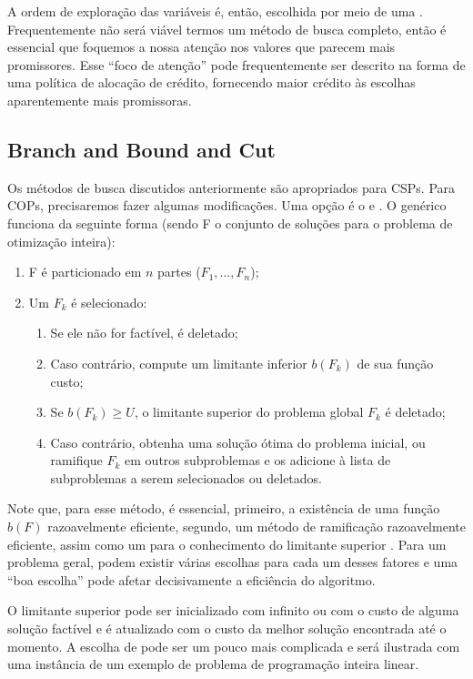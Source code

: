 \documentclass{article}
\begin{document}
A ordem de exploração das variáveis é, então, escolhida por meio de
uma . Frequentemente não será
viável termos um método de busca completo, então é essencial que
foquemos a nossa atenção nos valores que parecem mais
promissores. Esse ``foco de atenção'' pode frequentemente ser descrito
na forma de uma política de alocação de crédito, fornecendo maior
crédito às escolhas aparentemente mais promissoras.

\subsection{Branch and Bound and Cut}

Os métodos de busca discutidos anteriormente são apropriados para
CSPs. Para COPs, precisaremos fazer algumas modificações. Uma opção é
o  e . O
 genérico funciona da seguinte forma
(sendo F o conjunto de soluções para o problema de otimização
inteira):

\begin{enumerate}
\item F é particionado em $n$ partes ($F_1, \hdots, F_n$);
\item Um $F_k$ é selecionado:
  \begin{enumerate}
  \item Se ele não for factível, é deletado;
  \item Caso contrário, compute um limitante inferior $b(F_k)$ de
    sua função custo;
  \item Se $b(F_k) \geq U$, o limitante superior do problema
    global $F_k$ é deletado;
  \item Caso contrário, obtenha uma solução ótima do problema
    inicial, ou ramifique $F_k$ em outros subproblemas e os
    adicione à lista de subproblemas a serem selecionados ou
    deletados.
  \end{enumerate}
\end{enumerate}

Note que, para esse método, é essencial, primeiro, a existência de uma
função $b(F)$ razoavelmente eficiente, segundo, um método de
ramificação razoavelmente eficiente, assim como um para o conhecimento
do limitante superior . Para um problema geral, podem
existir várias escolhas para cada um desses fatores e uma ``boa
escolha'' pode afetar decisivamente a eficiência do algoritmo.

O limitante superior  pode ser inicializado com infinito
ou com o custo de alguma solução factível e é atualizado com o custo
da melhor solução encontrada até o momento. A escolha de 
pode ser um pouco mais complicada e será ilustrada com uma instância
de um exemplo de problema de programação inteira linear.
\end{document}
